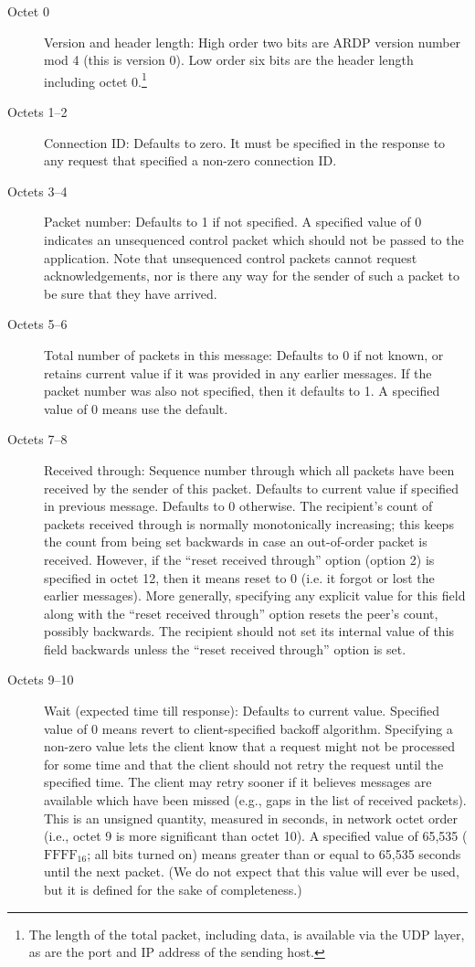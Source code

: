 \begin{description}
\item[Octet 0] Version and header length: High order two bits are ARDP
version number mod 4 (this is version 0). Low order six bits are the
header length including octet 0.\footnote{The length of the total
packet, including data, is available via the UDP layer, as are the
port and IP address of the sending host.}

\item[Octets 1--2] Connection ID: Defaults to zero.  It must be
specified in the response to any request that specified a non-zero
connection ID.

\item[Octets 3--4] Packet number: Defaults to 1 if not specified. A specified
value of 0 indicates an unsequenced control packet which should not
be passed to the application.   Note that unsequenced control packets
cannot request acknowledgements, nor is there any way for the sender
of such a packet to be sure that they have arrived.

\item[Octets 5--6] Total number of packets in this message:   Defaults
to 0 if not known, or retains current value if it was provided in any
earlier messages.  If the packet number was also not specified, then
it defaults to 1.  A specified value of 0 means use the default.

\item[Octets 7--8] Received through:   Sequence number through which
all packets have been received by the sender of this packet.  Defaults
to current value if specified in previous message. Defaults to 0
otherwise.  The recipient's count of packets received through is
normally monotonically increasing; this keeps the count from being set
backwards in case an out-of-order packet is received.  However, if the
``reset received through'' option (option 2) is specified in octet 12, then it
means reset to 0 (i.e. it forgot or lost the earlier messages).  More
generally, specifying any explicit value for this field along with the
``reset received through'' option resets the peer's count, possibly
backwards.  The recipient should not set its internal value of this
field backwards unless the ``reset received through'' option is set.

\item[Octets 9--10] Wait (expected time till response): Defaults to
current value. Specified value of 0 means revert to client-specified
backoff algorithm.  Specifying a non-zero value lets the
	client know that a request might not be processed for some time and
that the client should not retry the request until the specified time.
The client may retry sooner if it believes
messages are available which have been missed (e.g., gaps in the list
of received packets).  This is an unsigned
quantity, measured in seconds, in network octet order (i.e., octet 9 is
more significant than octet 10).  A specified value of 65,535
(\(\mbox{FFFF}_{16}\); 
all bits turned on) means greater than or equal to 65,535 seconds
until the next packet.  (We do not expect that this value will ever be
used, but it is defined for the sake of completeness.)   


\end{description}
